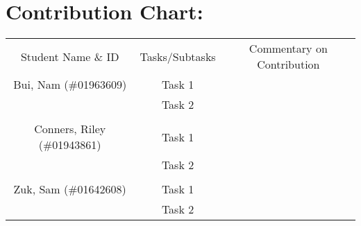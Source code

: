 \documentclass[11pt]{article}
\begin{document}
\section{Contribution Chart:}

\begin{table}[h]
    \centering
    \begin{tabular}{c|c|c}
        Student Name \& ID  & Tasks/Subtasks &  Commentary on Contribution \\
        Bui, Nam (\#01963609) & Task 1& \\
        & Task 2 & \\
        &&\\
        Conners, Riley (\#01943861) & Task 1& \\
        & Task 2 & \\
        &&\\
        Zuk, Sam (\#01642608)& Task 1& \\
        & Task 2 & \\
    \end{tabular}
    \label{tab:my_label}
\end{table}



\end{document}
